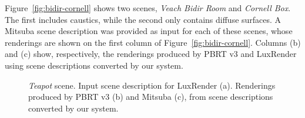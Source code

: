 Figure~\ref{fig:bidir-cornell} shows two scenes, \textit{Veach Bidir Room} and \textit{Cornell Box}. The first includes caustics, while the second only contains diffuse surfaces. A Mitsuba scene description was provided as input for each of these scenes, whose renderings are shown on the first column of Figure~\ref{fig:bidir-cornell}. Columns (b) and (c) show, respectively, the renderings produced by PBRT v3 and LuxRender using scene descriptions converted by our system.    



\begin{figure}
\centering

%
\caption{\textit{Teapot} scene. Input scene description for LuxRender (a).	Renderings produced by PBRT v3 (b) and Mitsuba (c),
	from scene descriptions converted by our system.}
\label{fig:teapot}
\end{figure}


